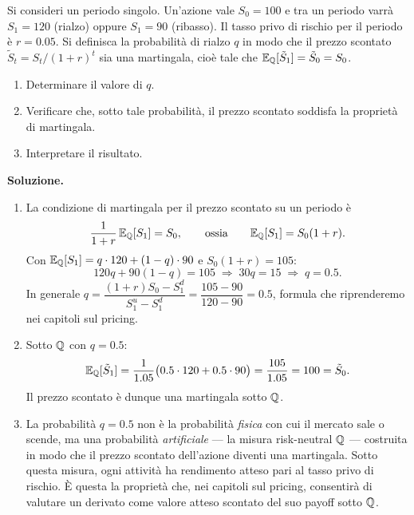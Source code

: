 \begin{exercise}
\label{ex:scontato}
Si consideri un periodo singolo. Un'azione vale $S_0=100$ e tra un
periodo varr\`{a} $S_1=120$ (rialzo) oppure $S_1=90$ (ribasso). Il
tasso privo di rischio per il periodo \`{e} $r=0.05$. Si definisca la
probabilit\`{a} di rialzo $q$ in modo che il prezzo scontato
$\tilde{S}_t=S_t/(1+r)^t$ sia una martingala, cio\`{e} tale che
$\mathbb{E}_{\mathbb{Q}}[\tilde{S}_1]=\tilde{S}_0=S_0$.
\begin{enumerate}
\item Determinare il valore di $q$.
\item Verificare che, sotto tale probabilit\`{a}, il prezzo scontato
soddisfa la propriet\`{a} di martingala.
\item Interpretare il risultato.
\end{enumerate}
\end{exercise}

\noindent
\textbf{Soluzione.}
\begin{enumerate}
\item La condizione di martingala per il prezzo scontato su un periodo
\`{e}
\[
\frac{1}{1+r}\,\mathbb{E}_{\mathbb{Q}}[S_1]=S_0,
\qquad\text{ossia}\qquad
\mathbb{E}_{\mathbb{Q}}[S_1]=S_0(1+r).
\]
Con $\mathbb{E}_{\mathbb{Q}}[S_1]=q\cdot 120+(1-q)\cdot 90$ e $S_0(1+r)=105$:
\[
120q+90(1-q)=105
\;\Longrightarrow\;
30q=15
\;\Longrightarrow\;
q=0.5.
\]
In generale $q=\dfrac{(1+r)S_0-S_1^d}{S_1^u-S_1^d}
=\dfrac{105-90}{120-90}=0.5$, formula che riprenderemo nei capitoli
sul pricing.

\item Sotto $\mathbb{Q}$ con $q=0.5$:
\[
\mathbb{E}_{\mathbb{Q}}[\tilde{S}_1]
=\frac{1}{1.05}\bigl(0.5\cdot 120+0.5\cdot 90\bigr)
=\frac{105}{1.05}=100=\tilde{S}_0.
\]
Il prezzo scontato \`{e} dunque una martingala sotto $\mathbb{Q}$.

\item La probabilit\`{a} $q=0.5$ non \`{e} la probabilit\`{a}
\emph{fisica} con cui il mercato sale o scende, ma una probabilit\`{a}
\emph{artificiale} --- la misura risk-neutral $\mathbb{Q}$ --- costruita in
modo che il prezzo scontato dell'azione diventi una martingala. Sotto
questa misura, ogni attivit\`{a} ha rendimento atteso pari al tasso
privo di rischio. \`{E} questa la propriet\`{a} che, nei capitoli sul
pricing, consentir\`{a} di valutare un derivato come valore atteso
scontato del suo payoff sotto $\mathbb{Q}$.
\end{enumerate}

